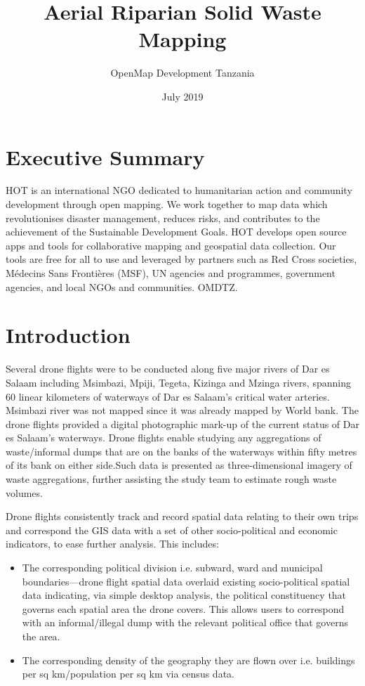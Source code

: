 \documentclass[a4paper,12pt,twoside]{article}
\title{Aerial Riparian Solid Waste Mapping}
\author{OpenMap Development Tanzania}
\date{July 2019}
\begin{document}
\maketitle

\newpage
\tableofcontents

\newpage
\section{Executive Summary}
\begin{multicols}{2}
HOT is an international NGO dedicated to humanitarian action and community development through open mapping. We work together to map data which revolutionises disaster management, reduces risks, and contributes to the achievement of the Sustainable Development Goals.
HOT develops open source apps and tools for collaborative mapping and geospatial data collection. Our tools are free for all to use and leveraged by partners such as Red Cross societies, Médecins Sans Frontières (MSF), UN agencies and programmes, government agencies, and local NGOs and communities.
OMDTZ.

\end{multicols}


\section{Introduction}

Several drone flights were to be  conducted along five major rivers of Dar es Salaam including  Msimbazi, Mpiji, Tegeta, Kizinga and Mzinga rivers, spanning 60 linear kilometers of waterways of Dar es Salaam’s critical water arteries. Msimbazi river was not mapped since it  was  already mapped by World bank. The drone flights provided a digital photographic mark-up of the current status of Dar es Salaam’s waterways.   
Drone flights enable studying any aggregations of waste/informal dumps that are on the banks of the waterways within fifty metres of its bank on either side.Such data is presented as three-dimensional imagery of waste aggregations, further assisting the study team to estimate rough waste volumes.

Drone flights consistently track and record spatial data relating to their own trips and correspond the GIS data with a set of other socio-political and economic indicators, to ease further analysis. This includes:   

\begin{itemize}
    \item The corresponding political division i.e. subward, ward and municipal boundaries—drone flight spatial data overlaid existing socio-political spatial data indicating, via simple desktop analysis, the political constituency that governs each spatial area the drone covers. This allows users to correspond with an informal/illegal dump with the relevant political office that governs the area.
    \item The corresponding density of the geography they are flown over i.e. buildings per sq km/population per sq km via census data. 
\end{itemize}
\end{document}
